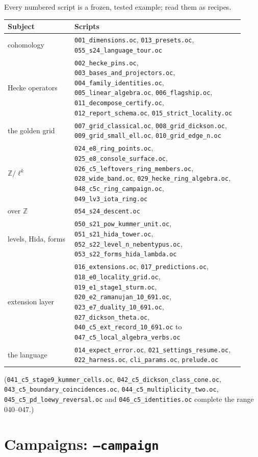 \documentclass[11pt,openany]{report}
\newcommand{\Z}{\mathbb{Z}}
\newcommand{\file}[1]{\nolinkurl{#1}}
\begin{document}
Every numbered script is a frozen, tested example; read them as recipes.
\begin{center}\small
\begin{tabular}{@{}>{\raggedright\arraybackslash}p{0.26\linewidth}>{\raggedright\arraybackslash}p{0.66\linewidth}@{}}
\toprule
\textbf{Subject} & \textbf{Scripts}\\\midrule
cohomology & \file{001_dimensions.oc}, \file{013_presets.oc}, \file{055_s24_language_tour.oc}\\
Hecke operators & \file{002_hecke_pins.oc}, \file{003_bases_and_projectors.oc}, \file{004_family_identities.oc}, \file{005_linear_algebra.oc}, \file{006_flagship.oc}, \file{011_decompose_certify.oc}, \file{012_report_schema.oc}, \file{015_strict_locality.oc}\\
the golden grid & \file{007_grid_classical.oc}, \file{008_grid_dickson.oc}, \file{009_grid_small_ell.oc}, \file{010_grid_edge_n.oc}\\
$\Z/\ell^k$ & \file{024_e8_ring_points.oc}, \file{025_e8_console_surface.oc}, \file{026_c5_leftovers_ring_members.oc}, \file{028_wide_band.oc}, \file{029_hecke_ring_algebra.oc}, \file{048_c5c_ring_campaign.oc}, \file{049_lv3_iota_ring.oc}\\
over $\Z$ & \file{054_s24_descent.oc}\\
levels, Hida, forms & \file{050_s21_pow_kummer_unit.oc}, \file{051_s21_hida_tower.oc}, \file{052_s22_level_n_nebentypus.oc}, \file{053_s22_forms_hida_lambda.oc}\\
extension layer & \file{016_extensions.oc}, \file{017_predictions.oc}, \file{018_e0_locality_grid.oc}, \file{019_e1_stage1_sturm.oc}, \file{020_e2_ramanujan_10_691.oc}, \file{023_e7_duality_10_691.oc}, \file{027_dickson_theta.oc}, \file{040_c5_ext_record_10_691.oc} to \file{047_c5_local_algebra_verbs.oc}\\
the language & \file{014_expect_error.oc}, \file{021_settings_resume.oc}, \file{022_harness.oc}, \file{cli_params.oc}, \file{prelude.oc}\\
\bottomrule
\end{tabular}
\end{center}
(\file{041_c5_stage9_kummer_cells.oc}, \file{042_c5_dickson_class_cone.oc}, \file{043_c5_boundary_coincidences.oc},
\file{044_c5_multiplicity_two.oc}, \file{045_c5_pd_loewy_reversal.oc} and \file{046_c5_identities.oc} complete the range
040--047.)

\chapter{Campaigns: \texttt{--campaign}}\label{ch:campaigns}
\end{document}
